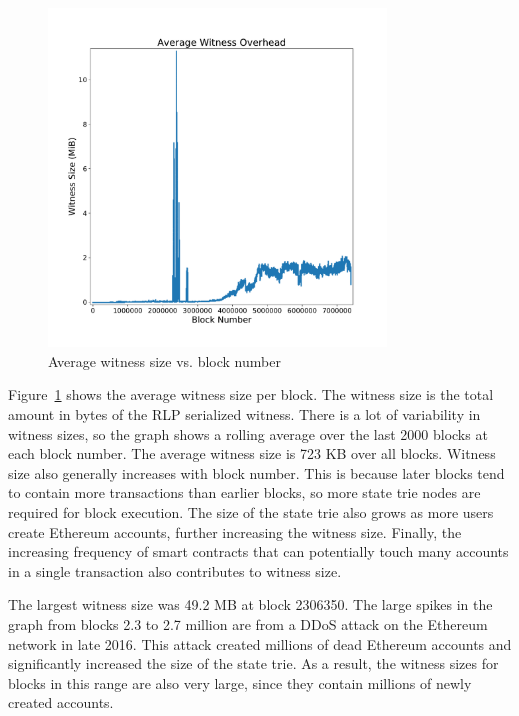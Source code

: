\documentclass[12pt]{article}
\newcommand{\figurewidth}{0.8\textwidth}
\begin{document}
\begin{figure}[H]
  \centering
  \includegraphics[width=\figurewidth]{../figures/results/graphs/background/witness-size.pdf}
  \caption{Average witness size vs. block number}
  \label{fig:witnesssize}
\end{figure}

Figure~\ref{fig:witnesssize} shows the average witness size per block. The witness size is the total amount in bytes of the RLP serialized witness. There is a lot of variability in witness sizes, so the graph shows a rolling average over the last 2000 blocks at each block number. The average witness size is 723 KB over all blocks. Witness size also generally increases with block number. This is because later blocks tend to contain more transactions than earlier blocks, so more state trie nodes are required for block execution. The size of the state trie also grows as more users create Ethereum accounts, further increasing the witness size. Finally, the increasing frequency of smart contracts that can potentially touch many accounts in a single transaction also contributes to witness size.

The largest witness size was 49.2 MB at block 2306350. The large spikes in the graph from blocks 2.3 to 2.7 million are from a DDoS attack on the Ethereum network in late 2016. This attack created millions of dead Ethereum accounts and significantly increased the size of the state trie. As a result, the witness sizes for blocks in this range are also very large, since they contain millions of newly created accounts.
\end{document}
